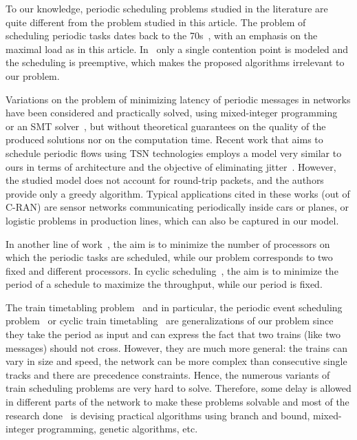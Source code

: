 \documentclass[pdflatex,sn-mathphys,iicol]{sn-jnl}%
\theoremstyle{thmstyleone}%
\theoremstyle{thmstyletwo}%
\theoremstyle{thmstylethree}%
\begin{document}
 To our knowledge, periodic scheduling problems studied in the literature are quite different from the problem studied in this article. The problem of scheduling periodic tasks dates back to the 70s~\cite{liu1973scheduling}, with an emphasis on the maximal load as in this article. In~\cite{liu1973scheduling} only a single contention point is modeled and the scheduling is preemptive, which makes the proposed algorithms irrelevant to our problem.

 Variations on the problem of minimizing latency of periodic messages in networks have been considered and practically solved, using mixed-integer programming~\cite{nayak2017incremental,steiner2018traffic} or an SMT solver~\cite{dos2019tsnsched}, but without theoretical guarantees on the quality of the produced solutions nor on the computation time. Recent work that aims to schedule periodic flows using TSN technologies employs a model very similar to ours in terms of architecture and the objective of eliminating jitter~\cite{9472838}. However, the studied model does not account for round-trip packets, and the authors provide only a greedy algorithm. Typical applications cited in these works (out of C-RAN) are sensor networks communicating periodically inside cars or planes, or logistic problems in production lines, which can also be captured in our model.

 In another line of work~\cite{korst1991periodic,hanen1993cyclic}, the aim is to minimize the number of processors on which the periodic tasks are scheduled, while our problem corresponds to two fixed and different processors. In cyclic scheduling~\cite{levner2010complexity}, the aim is to minimize the period of a schedule to maximize the throughput, while our period is fixed. 

 The train timetabling problem~\cite{lusby2011railway} and in particular, the periodic event scheduling problem~\cite{serafini1989mathematical} or cyclic train timetabling~\cite{zhang2019solving} are generalizations of our problem since they take the period as input and can express the fact that two trains (like two messages) should not cross. However, they are much more general: the trains can vary in size and speed, the network can be more complex than consecutive single tracks and there are precedence constraints. Hence, the numerous variants of train scheduling problems are very hard to solve. Therefore, some delay is allowed in different parts of the network to make these problems solvable and most of the research done~\cite{lusby2011railway} is devising practical algorithms using branch and bound, mixed-integer programming, genetic algorithms, etc. 
\end{document}
